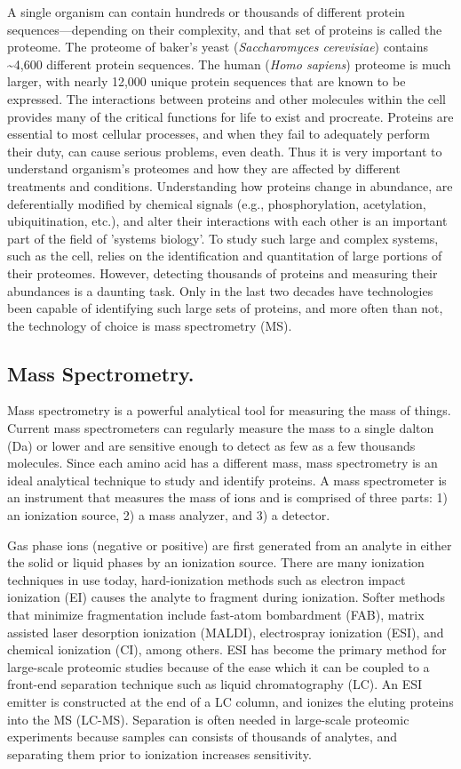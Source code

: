A single organism can contain hundreds or thousands of different protein sequences---depending on their complexity, and that set of proteins is called the proteome. The proteome of baker's yeast (\emph{Saccharomyces cerevisiae}) contains \textasciitilde4,600 different protein sequences. The human (\emph{Homo sapiens}) proteome is much larger, with nearly 12,000 unique protein sequences that are known to be expressed. The interactions between proteins and other molecules within the cell provides many of the critical functions for life to exist and procreate. Proteins are essential to most cellular processes, and when they fail to adequately perform their duty, can cause serious problems, even death. Thus it is very important to understand organism's proteomes and how they are affected by different treatments and conditions. Understanding how proteins change in abundance, are deferentially modified by chemical signals (e.g., phosphorylation, acetylation, ubiquitination, etc.), and alter their interactions with each other is an important part of the field of 'systems biology'. To study such large and complex systems, such as the cell, relies on the identification and quantitation of large portions of their proteomes. However, detecting thousands of proteins and measuring their abundances is a daunting task. Only in the last two decades have technologies been capable of identifying such large sets of proteins, and more often than not, the technology of choice is mass spectrometry (MS). 

\subsection*{Mass Spectrometry.}
Mass spectrometry is a powerful analytical tool for measuring the mass of things. Current mass spectrometers can regularly measure the mass to a single dalton (Da) or lower and are sensitive enough to detect as few as a few thousands molecules. Since each amino acid has a different mass, mass spectrometry is an ideal analytical technique to study and identify proteins. A mass spectrometer is an instrument that measures the mass of ions and is comprised of three parts: 1) an ionization source, 2) a mass analyzer, and 3) a detector. 

Gas phase ions (negative or positive) are first generated from an analyte in either the solid or liquid phases by an ionization source. There are many ionization techniques in use today, hard-ionization methods such as electron impact ionization (EI) causes the analyte to fragment during ionization. Softer methods that minimize fragmentation include fast-atom bombardment (FAB)\cite{fab}, matrix assisted laser desorption ionization (MALDI)\cite{maldi,maldi2}, electrospray ionization (ESI)\cite{esi}, and chemical ionization (CI)\cite{ci}, among others. ESI has become the primary method for large-scale proteomic studies because of the ease which it can be coupled to a front-end separation technique such as liquid chromatography (LC). An ESI emitter is constructed at the end of a LC column, and ionizes the eluting proteins into the MS (LC-MS). Separation is often needed in large-scale proteomic experiments because samples can consists of thousands of analytes, and separating them prior to ionization increases sensitivity. 

